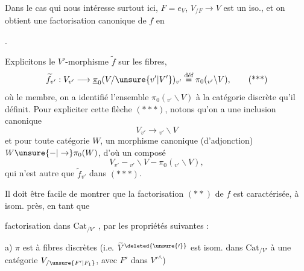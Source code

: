 Dans le cas qui nous intéresse surtout ici,
$F=e_V$, $V_{/F}\to V$ est un iso., et on
obtient une factorisation canonique de $f$ en


.

Explicitons le $V'$-morphisme $\widetilde f$ sur les
fibres,
\[
 \widetilde f_{v'}:V_{v'}\longrightarrow
 \underline{\pi}_0(V/\unsure{v'|V'})_{v'}\overset{\text{déf}}{=}\pi_0({}_{v'}\backslash V),\tag*{(***)}
\]
où  le  membre, on a identifié
l'ensemble $\pi_0({}_{v'}\backslash V)$ à la catégorie discrète
qu'il définit. Pour expliciter cette flèche
$(***)$, notons qu'on a une inclusion canonique
\[
 V_{v'}\longrightarrow{}_{v'}\backslash V
\]
et pour toute catégorie $W$, un morphisme
canonique (d'adjonction) $W\unsure{-|\to}\pi_0(W)$,
d'où un composé
\[
 V_{v'}-{}_{v'}\backslash V-\pi_0({}_{v'}\backslash V),
\]
qui n'est autre que $\widetilde f_{v'}$ dans $(***)$.

Il doit être facile de montrer que
la factorisation $(**)$ de $f$ est caractérisée,
à isom.  près,  en tant que


factorisation dans $\mathrm{Cat}_{/V'}$
\noindent,
par les propriétés suivantes :

a) $\pi$ est  à fibres discrètes 
(i.e. $\widetilde V^{\deleted{\unsure{\prime}}}$ est
isom. dans $\mathrm{Cat}_{/V'}$ à une catégorie $V_{/\unsure{F'|F_1}}$,
avec $F'$ dans $V'^\wedge$)

